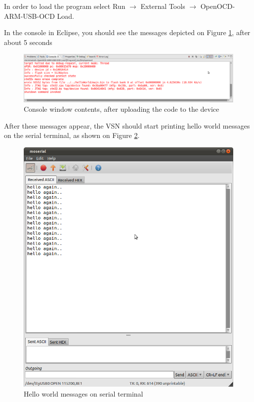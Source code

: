 \documentclass[a4paper, 10pt]{article}
\begin{document}
In order to load the program select
Run $\rightarrow$ External Tools $\rightarrow$ OpenOCD-ARM-USB-OCD Load.

In the console in Eclipse, you should see the messages depicted on
Figure \ref{fig:load-successful},
after about 5 seconds


    \begin{figure}[H]
    \centering
        \includegraphics[width=\textwidth]{./png-install-guide/load-successful.png}
        \caption{Console window contents, after uploading the code to the device}
        \label{fig:load-successful}
    \end{figure}

After these messages appear, the VSN should start printing hello world messages
on the serial terminal, as shown on Figure \ref{fig:hello-world}.

    \begin{figure}[H]
    \centering
        \includegraphics[width=\textwidth]{./png-install-guide/hello-world-moserial.png}
        \caption{Hello world messages on serial terminal}
        \label{fig:hello-world}
    \end{figure}
\end{document}
